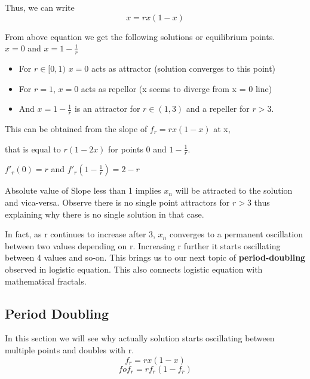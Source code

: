 \documentclass{report}
\begin{document}
Thus, we can write
\begin{equation}
    x = rx(1-x) \nonumber
\end{equation}

From above equation we get the following solutions or equilibrium points.\\

$x = 0$ and $x = 1 - \frac{1}{r}$
\begin{itemize}
  \item For $r \in [0,1)$ $x = 0$ acts as attractor (solution converges to this point)
  \item For $r = 1$, $x = 0$ acts as repellor (x seems to diverge from x = 0 line)
  \item And $x = 1 - \frac{1}{r}$ is an attractor for $r \in (1,3)$ and a repeller for $r > 3$.
\end{itemize}


This can be obtained from the slope of $f_r = rx(1-x)$ at x, \newline


that is equal to $r(1-2x)$ for points 0 and $1-\frac{1}{r}$.\newline

$f'_r(0) = r$  and $f'_r(1-\frac{1}{r}) = 2-r$\newline

Absolute value of Slope less than 1 implies $x_n$ will be attracted to the solution and vica-versa. Observe there is no single point attractors for $r>3$ thus explaining why there is no single solution in that case.

In fact, as r continues to increase after 3, $x_n$ converges to a permanent oscillation between two values depending on r. Increasing r further it starts oscillating between 4 values and so-on. This brings us to our next topic of \textbf{period-doubling} observed in logistic equation. This also connects logistic equation with mathematical fractals.
\newpage
\subsection{Period Doubling}
\raggedright
In this section we will see why actually solution starts oscillating between multiple points and doubles with r.
\begin{equation}
    f_r = rx(1-x) \nonumber
\end{equation}
\begin{equation}
    fof_r = rf_r(1-f_r) \nonumber
\end{equation}
\end{document}
